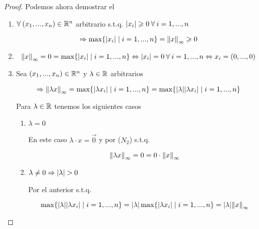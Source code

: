 \begin{proof}

Podemos ahora demostrar el 

\begin{enumerate}[label=(\subscript{N}{{\arabic*}})]
\item $\forall \: (x_1,...,x_n) \in \mathbb{R}^n$ arbitrario s.t.q. $\abs{{x}_{i}} \geqslant 0 \: \forall \: i = 1,...,n$

\begin{equation*}
    \Rightarrow  \max \{ \abs{{x}_{i}} \mid i = 1,...,n\} ={\norm{x}}_{\infty} \geqslant 0
\end{equation*}

\item 

\begin{equation*}
    {\norm{x}}_{\infty} = 0 = \max \{ \abs{{x}_{i}} \mid i = 1,...,n\} \Leftrightarrow \abs{{x}_{i}} = 0 \: \forall \: i = 1,...,n \Leftrightarrow {x}_{i} = (0,...,0)
\end{equation*}

\item Sea $(x_1,...,x_n) \in \mathbb{R}^n$ y $\lambda \in \mathbb{R}$ arbitrarios

\begin{equation*}
    \Rightarrow {\norm{\lambda x}}_{\infty}  = \max \{ \abs{{\lambda x}_{i}} \mid i = 1,...,n\} = \max \{ \abs{\lambda } \abs{{\lambda x}_{i}} \mid i = 1,...,n\}
\end{equation*}

Para $\lambda \in \mathbb{R}$ tenemos los siguientes casos

\begin{enumerate}
    \item $\lambda = 0$

    En este caso $\lambda \cdot x = \vec{0}$ y por ($N_2$) s.t.q.

    \begin{equation*}
        {\norm{\lambda x}}_{\infty} = 0 = 0 \cdot {\norm{ x}}_{\infty}
    \end{equation*}

    \item $\lambda \neq 0 \Rightarrow \abs{\lambda} > 0$

    Por el  anterior s.t.q.

    \begin{equation*}
        \max \{ \abs{\lambda } \abs{{\lambda x}_{i}} \mid i = 1,...,n\} = \abs{\lambda } \max \{  \abs{{\lambda x}_{i}} \mid i = 1,...,n\} = \abs{\lambda } {\norm{ x}}_{\infty}
    \end{equation*}
    

\end{enumerate}
\end{enumerate}
\end{proof}
